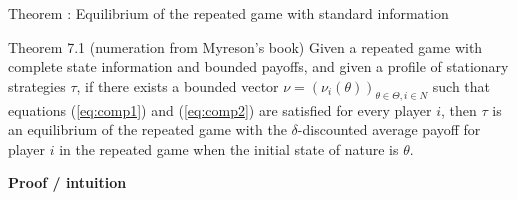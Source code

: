 \begin{frame}{Theorem : Equilibrium of the repeated game with standard information}
\begin{block}{Theorem 7.1 (numeration from Myreson's book)}
	Given a repeated game with complete state information and bounded payoffs, and given a profile of stationary strategies $\tau$, if there exists a bounded vector $\nu = (\nu_i(\theta))_{\theta \in \Theta, i \in N}$ such that equations (\ref{eq:comp1}) and (\ref{eq:comp2}) are satisfied for every player $i$, then $\tau$ is an equilibrium of the repeated game with the $\delta$-discounted average payoff for player $i$ in the repeated game when the initial state of nature is $\theta$.
\end{block}

\pause
\textbf{\color{green} Proof / intuition}


\end{frame}

